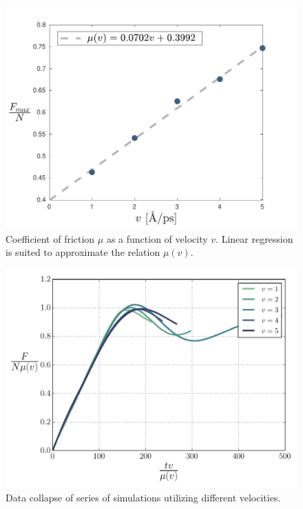 \documentclass[twoside,english]{uiofysmaster}
\begin{document}
\begin{figure}[H]
\centering
\includegraphics[width=0.7\linewidth]{figures/friction/scalingCoeffisient/u(v)}
\caption{Coefficient of friction $\mu$ as a function of velocity $v$. 
	Linear regression is suited to approximate the relation $\mu(v)$.}
\label{fig:springUvsV}
\end{figure}

\begin{figure}[H]
\centering
\includegraphics[width=0.7\linewidth]{figures/friction/scalingCoeffisient/dataCollapse}
\caption{Data collapse of series of simulations utilizing different velocities.}
\label{fig:springDataCollapse}
\end{figure}

\end{document}
